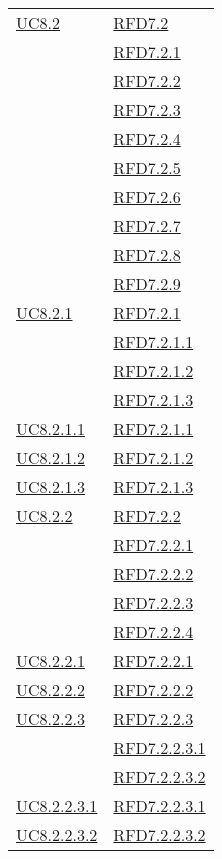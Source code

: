 \begin{longtable}{|>{\centering}m{5cm}|m{5cm}<{\centering}|}
\hyperref[UC8.2]{UC8.2} & \hyperlink{RFD7.2}{RFD7.2}\\
& \hyperlink{RFD7.2.1}{RFD7.2.1}\\
& \hyperlink{RFD7.2.2}{RFD7.2.2}\\
& \hyperlink{RFD7.2.3}{RFD7.2.3}\\
& \hyperlink{RFD7.2.4}{RFD7.2.4}\\
& \hyperlink{RFD7.2.5}{RFD7.2.5}\\
& \hyperlink{RFD7.2.6}{RFD7.2.6}\\
& \hyperlink{RFD7.2.7}{RFD7.2.7}\\
& \hyperlink{RFD7.2.8}{RFD7.2.8}\\
& \hyperlink{RFD7.2.9}{RFD7.2.9}\\ \hline
\hyperref[UC8.2.1]{UC8.2.1} & \hyperlink{RFD7.2.1}{RFD7.2.1}\\
& \hyperlink{RFD7.2.1.1}{RFD7.2.1.1}\\
& \hyperlink{RFD7.2.1.2}{RFD7.2.1.2}\\
& \hyperlink{RFD7.2.1.3}{RFD7.2.1.3}\\ \hline
\hyperref[UC8.2.1.1]{UC8.2.1.1} & \hyperlink{RFD7.2.1.1}{RFD7.2.1.1}\\ \hline
\hyperref[UC8.2.1.2]{UC8.2.1.2} & \hyperlink{RFD7.2.1.2}{RFD7.2.1.2}\\ \hline
\hyperref[UC8.2.1.3]{UC8.2.1.3} & \hyperlink{RFD7.2.1.3}{RFD7.2.1.3}\\ \hline
\hyperref[UC8.2.2]{UC8.2.2} & \hyperlink{RFD7.2.2}{RFD7.2.2}\\
& \hyperlink{RFD7.2.2.1}{RFD7.2.2.1}\\
& \hyperlink{RFD7.2.2.2}{RFD7.2.2.2}\\
& \hyperlink{RFD7.2.2.3}{RFD7.2.2.3}\\
& \hyperlink{RFD7.2.2.4}{RFD7.2.2.4}\\ \hline
\hyperref[UC8.2.2.1]{UC8.2.2.1} & \hyperlink{RFD7.2.2.1}{RFD7.2.2.1}\\ \hline
\hyperref[UC8.2.2.2]{UC8.2.2.2} & \hyperlink{RFD7.2.2.2}{RFD7.2.2.2}\\ \hline
\hyperref[UC8.2.2.3]{UC8.2.2.3} & \hyperlink{RFD7.2.2.3}{RFD7.2.2.3}\\
& \hyperlink{RFD7.2.2.3.1}{RFD7.2.2.3.1}\\
& \hyperlink{RFD7.2.2.3.2}{RFD7.2.2.3.2}\\ \hline
\hyperref[UC8.2.2.3.1]{UC8.2.2.3.1} & \hyperlink{RFD7.2.2.3.1}{RFD7.2.2.3.1}\\ \hline
\hyperref[UC8.2.2.3.2]{UC8.2.2.3.2} & \hyperlink{RFD7.2.2.3.2}{RFD7.2.2.3.2}\\ \hline

\end{longtable}
